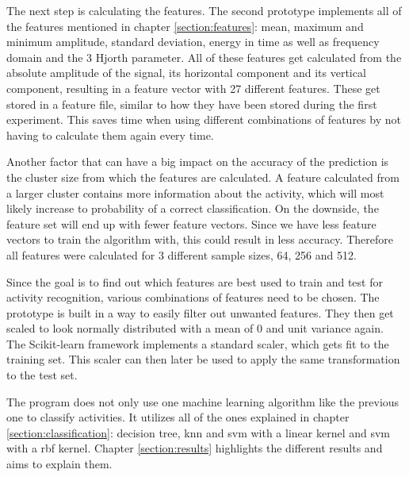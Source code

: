 The next step is calculating the features. The second prototype implements all of the features mentioned in chapter \ref{section:features}: mean, maximum and minimum amplitude, standard deviation, energy in time as well as frequency domain and the 3 Hjorth parameter. All of these features get calculated from the absolute amplitude of the signal, its horizontal component and its vertical component, resulting in a feature vector with 27 different features. These get stored in a feature file, similar to how they have been stored during the first experiment. This saves time when using different combinations of features by not having to calculate them again every time.

Another factor that can have a big impact on the accuracy of the prediction is the cluster size from which the features are calculated. A feature calculated from a larger cluster contains more information about the activity, which will most likely increase to probability of a correct classification. On the downside, the feature set will end up with fewer feature vectors. Since we have less feature vectors to train the algorithm with, this could result in less accuracy. Therefore all features were calculated for 3 different sample sizes, 64, 256 and 512.

Since the goal is to find out which features are best used to train and test for activity recognition, various combinations of features need to be chosen. The prototype is built in a way to easily filter out unwanted features. They then get scaled to look normally distributed with a mean of 0 and unit variance again. The Scikit-learn framework implements a standard scaler, which gets fit to the training set. This scaler can then later be used to apply the same transformation to the test set.

The program does not only use one machine learning algorithm like the previous one to classify activities. It utilizes all of the ones explained in chapter \ref{section:classification}: decision tree, \gls{knn} and \gls{svm} with a linear kernel and \gls{svm} with a \gls{rbf} kernel. Chapter \ref{section:results} highlights the different results and aims to explain them.
